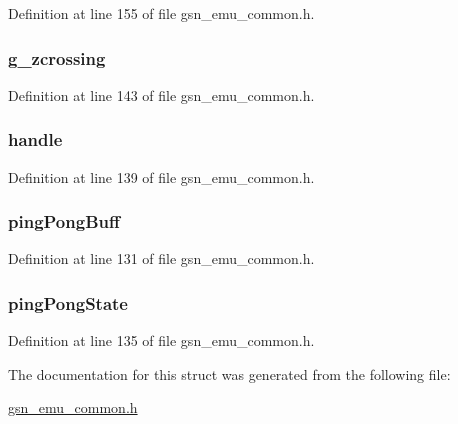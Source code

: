 Definition at line 155 of file gsn\_\-emu\_\-common.h.

\hypertarget{a00066_ab3bcbdee02debdf713730fbb251b274e}{
\subsubsection[{g\_\-zcrossing}]{ {\bf g\_\-zcrossing}}}
\label{a00066_ab3bcbdee02debdf713730fbb251b274e}


Definition at line 143 of file gsn\_\-emu\_\-common.h.

\hypertarget{a00066_af2a1928de194a6cf6e6db41e7ebf7dd5}{
\subsubsection[{handle}]{ {\bf handle}}}
\label{a00066_af2a1928de194a6cf6e6db41e7ebf7dd5}


Definition at line 139 of file gsn\_\-emu\_\-common.h.

\hypertarget{a00066_a069558f9b87af8f37c508ad145a917c6}{
\subsubsection[{pingPongBuff}]{ {\bf pingPongBuff}}}
\label{a00066_a069558f9b87af8f37c508ad145a917c6}


Definition at line 131 of file gsn\_\-emu\_\-common.h.

\hypertarget{a00066_a0e56c3b9f4b804edeb05c23ceb78f93a}{
\subsubsection[{pingPongState}]{ {\bf pingPongState}}}
\label{a00066_a0e56c3b9f4b804edeb05c23ceb78f93a}


Definition at line 135 of file gsn\_\-emu\_\-common.h.



The documentation for this struct was generated from the following file:\begin{DoxyCompactItemize}
\item 
\hyperlink{a00490}{gsn\_\-emu\_\-common.h}\end{DoxyCompactItemize}
